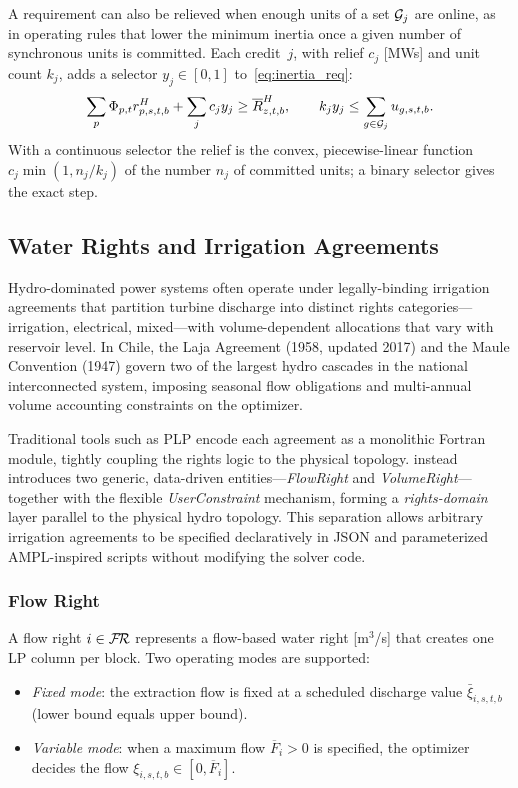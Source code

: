 A requirement can also be relieved when enough units of a set
$\mathcal{G}_j$ are online, as in operating rules that lower the minimum
inertia once a given number of synchronous units is committed.  Each
credit~$j$, with relief $c_j$ [MWs] and unit count $k_j$, adds a
selector $y_j \in [0,1]$ to~\eqref{eq:inertia_req}:
\begin{equation}
\label{eq:inertia_credit}
\sum_{p} \Phi_{p,t} r^H_{p,s,t,b} + \sum_j c_j y_j
  \geq \overline{R}^H_{z,t,b},
\qquad
k_j y_j \leq \sum_{g \in \mathcal{G}_j} u_{g,s,t,b}.
\end{equation}
With a continuous selector the relief is the convex, piecewise-linear
function $c_j \min(1, n_j/k_j)$ of the number $n_j$ of committed units;
a binary selector gives the exact step.

\subsection{Water Rights and Irrigation Agreements}
\label{sec:rights}

Hydro-dominated power systems often operate under legally-binding
irrigation agreements that partition turbine discharge into distinct
rights categories---irrigation, electrical, mixed---with
volume-dependent allocations that vary with reservoir level.  In Chile,
the Laja Agreement (1958, updated 2017) and the Maule Convention (1947)
govern two of the largest hydro cascades in the national interconnected
system, imposing seasonal flow obligations and multi-annual volume
accounting constraints on the optimizer.

Traditional tools such as PLP encode each agreement as a monolithic
Fortran module, tightly coupling the rights logic to the physical
topology.  \gtopt{} instead introduces two generic, data-driven
entities---\emph{FlowRight} and \emph{VolumeRight}---together with
the flexible \emph{UserConstraint} mechanism, forming a
\emph{rights-domain} layer parallel to the physical hydro topology.
This separation allows arbitrary irrigation agreements to be specified
declaratively in JSON and parameterized AMPL-inspired scripts without
modifying the solver code.

\subsubsection{Flow Right}

A flow right $i \in \mathcal{F\!R}$ represents a flow-based water right
[m$^3$/s] that creates one LP column per block.  Two operating modes
are supported:
\begin{itemize}
  \item \emph{Fixed mode}: the extraction flow is fixed at a scheduled
    discharge value $\bar{\xi}_{i,s,t,b}$ (lower bound equals upper
    bound).
  \item \emph{Variable mode}: when a maximum flow $\overline{F}_i > 0$
    is specified, the optimizer decides the flow
    $\xi_{i,s,t,b} \in [0, \overline{F}_i]$.
\end{itemize}

